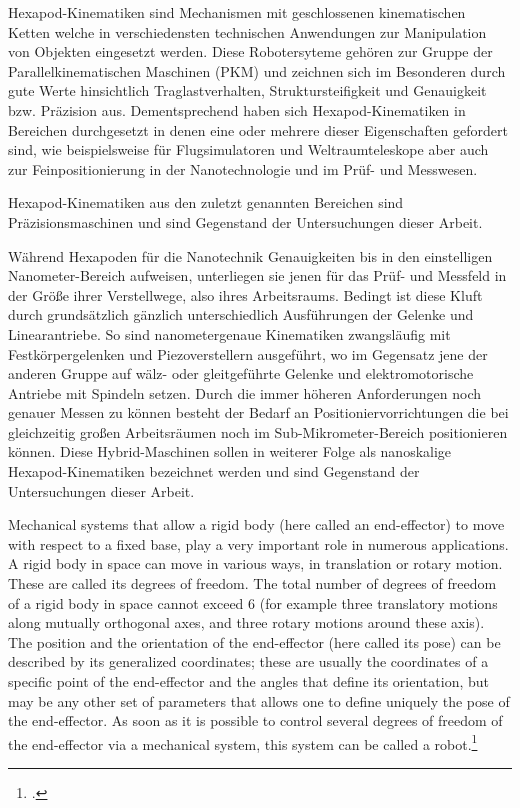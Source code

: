 Hexapod-Kinematiken sind Mechanismen mit geschlossenen kinematischen Ketten welche in verschiedensten technischen Anwendungen zur Manipulation von Objekten eingesetzt werden. Diese Robotersyteme gehören zur Gruppe der Parallelkinematischen Maschinen (PKM) und zeichnen sich im Besonderen durch gute Werte hinsichtlich Traglastverhalten, Struktursteifigkeit und Genauigkeit bzw. Präzision aus. Dementsprechend haben sich Hexapod-Kinematiken in Bereichen durchgesetzt in denen eine oder mehrere dieser Eigenschaften gefordert sind, wie beispielsweise für Flugsimulatoren und Weltraumteleskope aber auch zur Feinpositionierung in der Nanotechnologie und im Prüf- und Messwesen. 

Hexapod-Kinematiken aus den zuletzt genannten Bereichen sind Präzisionsmaschinen und sind Gegenstand der Untersuchungen dieser Arbeit.

Während Hexapoden für die Nanotechnik Genauigkeiten bis in den einstelligen Nanometer-Bereich aufweisen, unterliegen sie jenen für das Prüf- und Messfeld in der Größe ihrer Verstellwege, also ihres Arbeitsraums. Bedingt ist diese Kluft durch grundsätzlich gänzlich unterschiedlich Ausführungen der Gelenke und Linearantriebe. So sind nanometergenaue Kinematiken zwangsläufig mit Festkörpergelenken und Piezoverstellern ausgeführt, wo im Gegensatz jene der anderen Gruppe auf wälz- oder gleitgeführte Gelenke und elektromotorische Antriebe mit Spindeln setzen. Durch die immer höheren Anforderungen noch genauer Messen zu können besteht der Bedarf an Positioniervorrichtungen die bei gleichzeitig großen Arbeitsräumen noch im Sub-Mikrometer-Bereich positionieren können. Diese Hybrid-Maschinen sollen in weiterer Folge als nanoskalige Hexapod-Kinematiken bezeichnet werden und sind Gegenstand der Untersuchungen dieser Arbeit.


\begin{em}
Mechanical systems that allow a rigid body (here called an end-effector)
to move with respect to a fixed base, play a very important role in numerous applications. A rigid body in space can move in various ways, in
translation or rotary motion. These are called its degrees of freedom. The
total number of degrees of freedom of a rigid body in space cannot exceed 6 (for example three translatory motions along mutually orthogonal
axes, and three rotary motions around these axis). The position and the
orientation of the end-effector (here called its pose) can be described by
its generalized coordinates; these are usually the coordinates of a specific
point of the end-effector and the angles that define its orientation, but may
be any other set of parameters that allows one to define uniquely the pose
of the end-effector. As soon as it is possible to control several degrees of
freedom of the end-effector via a mechanical system, this system can be
called a robot.\footcite[Vgl.][1]{Merlet2006}
\end{em}

